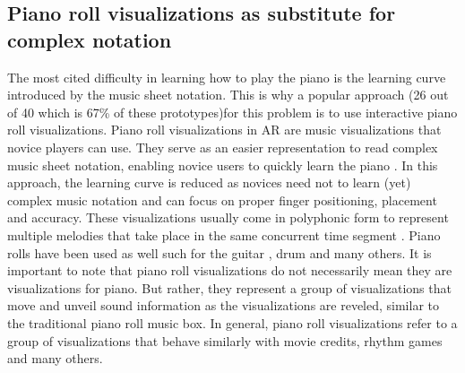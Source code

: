 \documentclass[sigchi, review]{acmart}
\begin{document}
\subsection{Piano roll visualizations as substitute for complex notation}
\label{subsec: pianoroll}
The most cited difficulty in learning how to play the piano is the learning curve introduced by the music sheet notation. This is why a popular approach (26 out of 40 \textendash  which is 67\% of these prototypes)for this problem is to use interactive piano roll visualizations. Piano roll visualizations in AR are music visualizations that novice players can use. They serve as an easier representation to read complex music sheet notation, enabling novice users to quickly learn the piano \cite{walder2016modelling}. In this approach, the learning curve is reduced as novices need not to learn (yet) complex music notation and can focus on proper finger positioning, placement and accuracy. These visualizations usually come in polyphonic form to represent multiple melodies that take place in the same concurrent time segment \cite{ciuha2010visualization}.  Piano rolls have been used as well such for the guitar \cite{biamonte2010musical}, drum \cite{rossignol2015alternate} and many others. It is important to note that piano roll visualizations do not necessarily mean they are visualizations for piano. But rather, they represent a group of visualizations that move and unveil sound information as the visualizations are reveled, similar to the traditional piano roll music box. In general, piano roll visualizations refer to a group of visualizations that behave similarly with movie credits, rhythm games and many others. 
\end{document}

